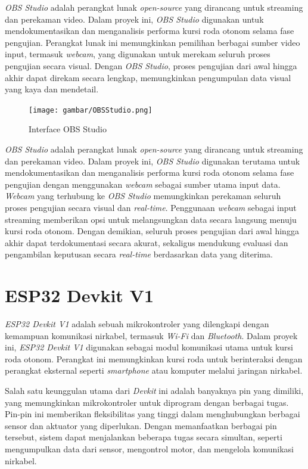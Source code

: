 \emph{OBS Studio} adalah perangkat lunak \emph{open-source} yang dirancang untuk streaming dan perekaman video. Dalam proyek ini, \emph{OBS Studio} digunakan untuk mendokumentasikan dan menganalisis performa kursi roda otonom selama fase pengujian. Perangkat lunak ini memungkinkan pemilihan berbagai sumber video input, termasuk \emph{webcam}, yang digunakan untuk merekam seluruh proses pengujian secara visual. Dengan \emph{OBS Studio}, proses pengujian dari awal hingga akhir dapat direkam secara lengkap, memungkinkan pengumpulan data visual yang kaya dan mendetail.

\begin{figure}[H]
  \centering
  \texttt{[image: gambar/OBSStudio.png]}
  \caption{Interface OBS Studio}
  \label{fig:Gambar OBS}
\end{figure}

\emph{OBS Studio} adalah perangkat lunak \emph{open-source} yang dirancang untuk streaming dan perekaman video. Dalam proyek ini, \emph{OBS Studio} digunakan terutama untuk mendokumentasikan dan menganalisis performa kursi roda otonom selama fase pengujian dengan menggunakan \emph{webcam} sebagai sumber utama input data. \emph{Webcam} yang terhubung ke \emph{OBS Studio} memungkinkan perekaman seluruh proses pengujian secara visual dan \emph{real-time}. Penggunaan \emph{webcam} sebagai input streaming memberikan opsi untuk melangsungkan data secara langsung menuju kursi roda otonom. Dengan demikian, seluruh proses pengujian dari awal hingga akhir dapat terdokumentasi secara akurat, sekaligus mendukung evaluasi dan pengambilan keputusan secara \emph{real-time} berdasarkan data yang diterima.

\section{ESP32 Devkit V1}
\label{sec:ESP32 Devkit V1}

\emph{ESP32 Devkit V1} adalah sebuah mikrokontroler yang dilengkapi dengan kemampuan komunikasi nirkabel, termasuk \emph{Wi-Fi} dan \emph{Bluetooth}. Dalam proyek ini, \emph{ESP32 Devkit V1} digunakan sebagai modul komunikasi utama untuk kursi roda otonom. Perangkat ini memungkinkan kursi roda untuk berinteraksi dengan perangkat eksternal seperti \emph{smartphone} atau komputer melalui jaringan nirkabel.

Salah satu keunggulan utama dari \emph{Devkit} ini adalah banyaknya pin yang dimiliki, yang memungkinkan mikrokontroler untuk diprogram dengan berbagai tugas. Pin-pin ini memberikan fleksibilitas yang tinggi dalam menghubungkan berbagai sensor dan aktuator yang diperlukan. Dengan memanfaatkan berbagai pin tersebut, sistem dapat menjalankan beberapa tugas secara simultan, seperti mengumpulkan data dari sensor, mengontrol motor, dan mengelola komunikasi nirkabel.

